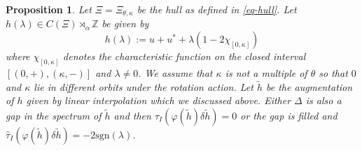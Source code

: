 \documentclass[11pt]{amsart}
\newtheorem{prop}{Proposition}[section]
\newcommand{\Z}{\mathbb{Z}}
\newcommand{\cut}{\kappa}
\begin{document}
\begin{prop} \label{prop-n2}
Let $\Xi = \Xi_{\theta,\cut}$ be the hull as defined in \eqref{eq-hull}. Let $h(\lambda)\in C(\Xi)\rtimes_\alpha\Z$ be given by 
\begin{equation}
	\nonumber%
	h(\lambda) := u+u^*+\lambda(1-2\chi_{[0, \cut]})
\end{equation}
where  
$\chi_{[0, \cut]}$ denotes the characteristic function on the closed interval
$[(0,+),(\cut,-)]$ and $\lambda\neq 0$. We assume that $\cut$ is not a multiple of $\theta$ so that $0$ and $\cut$ lie in different orbits under the rotation action. 
Let $\tilde h$ be the augmentation of $h$ given by linear interpolation which we discussed above. Either $\Delta$ is also a gap in the spectrum of $\tilde h$ and then $\hat\tau_I(\varphi(\tilde h)\delta \tilde h)=0$
or the gap is filled and %
$\hat\tau_I(\varphi(\tilde h)\delta \tilde h)=-2\mathrm{sgn}(\lambda)$.
\end{prop}
\end{document}
